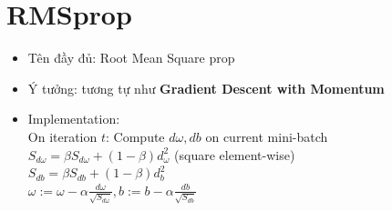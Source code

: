 \documentclass[12pt,a4paper]{report}
\begin{document}
	\section{RMSprop}
		\begin{itemize}
			\item Tên đầy đủ: Root Mean Square prop
			\item Ý tưởng: tương tự như \textbf{Gradient Descent with Momentum}
			\item Implementation: \\
				On iteration $t$:
				\tabto{0.5cm} Compute $d\omega, db$ on current mini-batch \\
				\tabto{0.5cm} $ S_{d\omega} = \beta S_{d\omega} + (1 - \beta) d_\omega^2 $ (square element-wise)\\
				\tabto{0.5cm} $ S_{db} = \beta S_{db} + (1 - \beta) d_b^2 $\\
				\tabto{0.5cm} $ \omega := \omega - \alpha \frac{d\omega}{\sqrt{S_{d\omega}}}, b := b - \alpha \frac{db}{\sqrt{S_{db}}} $\\
		\end{itemize}
\end{document}
